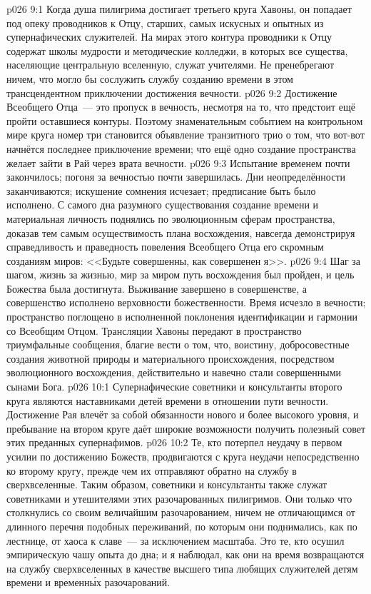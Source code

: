 \vs p026 9:1 Когда душа пилигрима достигает третьего круга Хавоны, он попадает под опеку проводников к Отцу, старших, самых искусных и опытных из супернафических служителей. На мирах этого контура проводники к Отцу содержат школы мудрости и методические колледжи, в которых все существа, населяющие центральную вселенную, служат учителями. Не пренебрегают ничем, что могло бы сослужить службу созданию времени в этом трансцендентном приключении достижения вечности.
\vs p026 9:2 Достижение Всеобщего Отца~--- это пропуск в вечность, несмотря на то, что предстоит ещё пройти оставшиеся контуры. Поэтому знаменательным событием на контрольном мире круга номер три становится объявление транзитного трио о том, что вот\hyp{}вот начнётся последнее приключение времени; что ещё одно создание пространства желает зайти в Рай через врата вечности.
\vs p026 9:3 \pc Испытание временем почти закончилось; погоня за вечностью почти завершилась. Дни неопределённости заканчиваются; искушение сомнения исчезает; предписание быть  было исполнено. С самого дна разумного существования создание времени и материальная личность поднялись по эволюционным сферам пространства, доказав тем самым осуществимость плана восхождения, навсегда демонстрируя справедливость и праведность повеления Всеобщего Отца его скромным созданиям миров: <<Будьте совершенны, как совершенен я>>.
\vs p026 9:4 Шаг за шагом, жизнь за жизнью, мир за миром путь восхождения был пройден, и цель Божества была достигнута. Выживание завершено в совершенстве, а совершенство исполнено верховности божественности. Время исчезло в вечности; пространство поглощено в исполненной поклонения идентификации и гармонии со Всеобщим Отцом. Трансляции Хавоны передают в пространство триумфальные сообщения, благие вести о том, что, воистину, добросовестные создания животной природы и материального происхождения, посредством эволюционного восхождения, действительно и навечно стали совершенными сынами Бога.
\vs p026 10:1 Супернафические советники и консультанты второго круга являются наставниками детей времени в отношении пути вечности. Достижение Рая влечёт за собой обязанности нового и более высокого уровня, и пребывание на втором круге даёт широкие возможности получить полезный совет этих преданных супернафимов.
\vs p026 10:2 \pc Те, кто потерпел неудачу в первом усилии по достижению Божеств, продвигаются с круга неудачи непосредственно ко второму кругу, прежде чем их отправляют обратно на службу в сверхвселенные. Таким образом, советники и консультанты также служат советниками и утешителями этих разочарованных пилигримов. Они только что столкнулись со своим величайшим разочарованием, ничем не отличающимся от длинного перечня подобных переживаний, по которым они поднимались, как по лестнице, от хаоса к славе~--- за исключением масштаба. Это те, кто осушил эмпирическую чашу опыта до дна; и я наблюдал, как они на время возвращаются на службу сверхвселенных в качестве высшего типа любящих служителей детям времени и временн\'ых разочарований.
